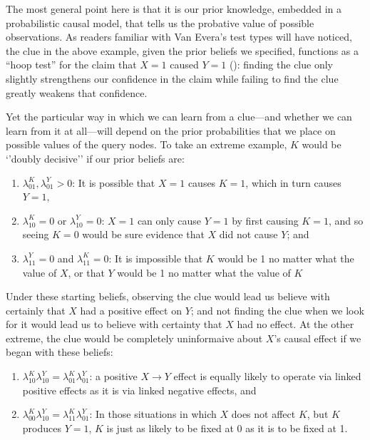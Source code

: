 \documentclass[12pt,]{book}
\providecommand{\tightlist}{%
  \setlength{\itemsep}{0pt}\setlength{\parskip}{0pt}}
\begin{document}
The most general point here is that it is our prior knowledge, embedded in a probabilistic causal model, that tells us the probative value of possible observations. As readers familiar with Van Evera's test types will have noticed, the clue in the above example, given the prior beliefs we specified, functions as a ``hoop test'' for the claim that \(X=1\) caused \(Y=1\) (\citet{Van-Evera:1997}): finding the clue only slightly strengthens our confidence in the claim while failing to find the clue greatly weakens that confidence.

Yet the particular way in which we can learn from a clue---and whether we can learn from it at all---will depend on the prior probabilities that we place on possible values of the query nodes. To take an extreme example, \(K\) would be `'doubly decisive'' if our prior beliefs are:

\begin{enumerate}
\def\labelenumi{\arabic{enumi}.}
\tightlist
\item
  \(\lambda^K_{01}, \lambda^Y_{01}>0\): It is possible that \(X=1\) causes \(K=1\), which in turn causes \(Y=1\),
\item
  \(\lambda^K_{10}=0\) or \(\lambda^Y_{10}=0\): \(X=1\) can only cause \(Y=1\) by first causing \(K=1\), and so seeing \(K=0\) would be sure evidence that \(X\) did not cause \(Y\); and
\item
  \(\lambda^Y_{11}=0\) and \(\lambda^K_{11}=0\): It is impossible that \(K\) would be 1 no matter what the value of \(X\), or that \(Y\) would be 1 no matter what the value of \(K\)
\end{enumerate}

Under these starting beliefs, observing the clue would lead us believe with certainly that \(X\) had a positive effect on \(Y\); and not finding the clue when we look for it would lead us to believe with certainty that \(X\) had no effect.
At the other extreme, the clue would be completely uninformaive about \(X\)'s causal effect if we began with these beliefs:

\begin{enumerate}
\def\labelenumi{\arabic{enumi}.}
\tightlist
\item
  \(\lambda_{10}^{K}\lambda_{10}^{Y} = \lambda_{01}^{K}\lambda_{01}^{Y}\): a positive \(X \rightarrow Y\) effect is equally likely to operate via linked positive effects as it is via linked negative effects, and
\item
  \(\lambda_{00}^{K}\lambda_{10}^{Y} = \lambda_{11}^{K}\lambda_{01}^{Y}\): In those situations in which \(X\) does not affect \(K\), but \(K\) produces \(Y=1\), \(K\) is just as likely to be fixed at 0 as it is to be fixed at 1.
\end{enumerate}
\end{document}
